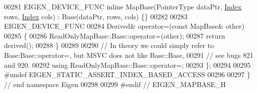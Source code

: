 \begin{DoxyCode}
00281     EIGEN\_DEVICE\_FUNC \textcolor{keyword}{inline} MapBase(PointerType dataPtr, \hyperlink{namespace_eigen_a62e77e0933482dafde8fe197d9a2cfde}{Index} rows, \hyperlink{namespace_eigen_a62e77e0933482dafde8fe197d9a2cfde}{Index} cols) : Base(dataPtr,
       rows, cols) \{\}
00282 
00283     EIGEN\_DEVICE\_FUNC
00284     Derived& operator=(\textcolor{keyword}{const} MapBase& other)
00285     \{
00286       ReadOnlyMapBase::Base::operator=(other);
00287       \textcolor{keywordflow}{return} derived();
00288     \}
00289 
00290     \textcolor{comment}{// In theory we could simply refer to Base:Base::operator=, but MSVC does not like Base::Base,}
00291     \textcolor{comment}{// see bugs 821 and 920.}
00292     \textcolor{keyword}{using} ReadOnlyMapBase::Base::operator=;
00293 \};
00294 
00295 \textcolor{preprocessor}{#undef EIGEN\_STATIC\_ASSERT\_INDEX\_BASED\_ACCESS}
00296 
00297 \} \textcolor{comment}{// end namespace Eigen}
00298 
00299 \textcolor{preprocessor}{#endif // EIGEN\_MAPBASE\_H}
\end{DoxyCode}
